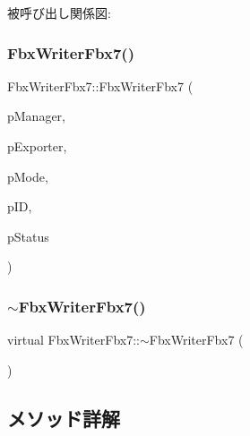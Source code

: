 被呼び出し関係図\+:
\mbox{\label{class_fbx_writer_fbx7_a1ebf15f7ec23f04e86f6121d692d9662}} 
\subsubsection{\texorpdfstring{Fbx\+Writer\+Fbx7()}{FbxWriterFbx7()}\hspace{0.1cm}{\footnotesize\ttfamily [2/2]}}
{\footnotesize\ttfamily Fbx\+Writer\+Fbx7\+::\+Fbx\+Writer\+Fbx7 (\begin{DoxyParamCaption}\item[{\hyperlink{class_fbx_manager}{Fbx\+Manager} \&}]{p\+Manager,  }\item[{\hyperlink{class_fbx_exporter}{Fbx\+Exporter} \&}]{p\+Exporter,  }\item[{\hyperlink{class_fbx_writer_fbx7_a07b7bcbb11c9befcbd0eacd265458005}{E\+Export\+Mode}}]{p\+Mode,  }\item[{int}]{p\+ID,  }\item[{\hyperlink{class_fbx_status}{Fbx\+Status} \&}]{p\+Status }\end{DoxyParamCaption})}

\mbox{\label{class_fbx_writer_fbx7_a116024d4ff2472c4aac86eb6acade7b0}} 
\subsubsection{\texorpdfstring{$\sim$\+Fbx\+Writer\+Fbx7()}{~FbxWriterFbx7()}}
{\footnotesize\ttfamily virtual Fbx\+Writer\+Fbx7\+::$\sim$\+Fbx\+Writer\+Fbx7 (\begin{DoxyParamCaption}{ }\end{DoxyParamCaption})\hspace{0.3cm}{\ttfamily [virtual]}}



\subsection{メソッド詳解}
\mbox{\label{class_fbx_writer_fbx7_aba83cb046ac5f4154443bdf3bd1503c0}} 
